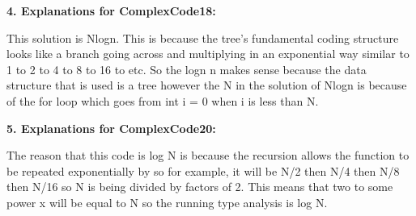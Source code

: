\documentclass[11pt, oneside]{article}   	%
\begin{document}
\vspace{5mm}


\textbf{4. Explanations for ComplexCode18:}

This solution is Nlogn. This is because the tree's fundamental coding structure looks like a branch going across and multiplying in an exponential way similar to 1 to 2 to 4 to 8 to 16 to etc. So the logn n makes sense because the data structure that is used is a tree however the N in the solution of Nlogn is because of the for loop which goes from int i = 0 when i is less than N. 

\vspace{5mm}

\textbf{5. Explanations for ComplexCode20:}

The reason that this code is log N is because the recursion allows the function to be repeated exponentially by so for example, it will be N/2 then N/4 then N/8 then N/16 so N is being divided by factors of 2. This means that two to some power x will be equal to N so the running type analysis is log N. 
\end{document}
